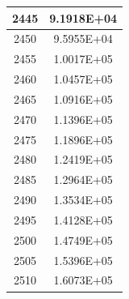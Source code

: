 \documentclass[a4paper]{article}
\begin{document}
\begin{tabular}{|c|c|}
		\hline
		2445 & 9.1918E+04 \\
		\hline
		2450 & 9.5955E+04 \\
		\hline
		2455 & 1.0017E+05 \\
		\hline
		2460 & 1.0457E+05 \\
		\hline
		2465 & 1.0916E+05 \\
		\hline
		2470 & 1.1396E+05 \\
		\hline
		2475 & 1.1896E+05 \\
		\hline
		2480 & 1.2419E+05 \\
		\hline
		2485 & 1.2964E+05 \\
		\hline
		2490 & 1.3534E+05 \\
		\hline
		2495 & 1.4128E+05 \\
		\hline
		2500 & 1.4749E+05 \\
		\hline
		2505 & 1.5396E+05 \\
		\hline
		2510 & 1.6073E+05 \\
		\hline
	\end{tabular}
	\hfill
\end{document}

